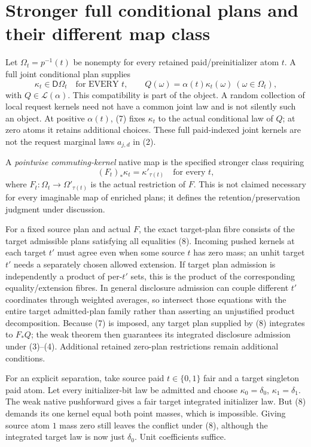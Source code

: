 \documentclass[11pt]{article}
\begin{document}
\section{Stronger full conditional plans and their different map class}
Let $\Omega_t=p^{-1}(t)$ be nonempty for every retained paid/preinitializer atom $t$. A full joint conditional plan supplies
\[
 \kappa_t\in\mathsf D\Omega_t\quad\text{for EVERY }t,
 \qquad Q(\omega)=\alpha(t)\kappa_t(\omega)\ (\omega\in\Omega_t), \tag{7}
\]
with $Q\in\mathcal L(\alpha)$. This compatibility is part of the object. A random collection of local request kernels need not have a common joint law and is not silently such an object. At positive $\alpha(t)$, (7) fixes $\kappa_t$ to the actual conditional law of $Q$; at zero atoms it retains additional choices. These full paid-indexed joint kernels are not the request marginal laws $a_{j,d}$ in (2).

A \emph{pointwise commuting-kernel} native map is the specified stronger class requiring
\[
                  (F_t)_*\kappa_t=\kappa'_{\tau(t)}
                       \quad\text{for every }t,       \tag{8}
\]
where $F_t:\Omega_t\to\Omega'_{\tau(t)}$ is the actual restriction of $F$. This is not claimed necessary for every imaginable map of enriched plans; it defines the retention/preservation judgment under discussion.

For a fixed source plan and actual $F$, the exact target-plan fibre consists of the target admissible plans satisfying all equalities (8). Incoming pushed kernels at each target $t'$ must agree even when some source $t$ has zero mass; an unhit target $t'$ needs a separately chosen allowed extension. If target plan admission is independently a product of per-$t'$ sets, this is the product of the corresponding equality/extension fibres. In general disclosure admission can couple different $t'$ coordinates through weighted averages, so intersect those equations with the entire target admitted-plan family rather than asserting an unjustified product decomposition. Because (7) is imposed, any target plan supplied by (8) integrates to $F_*Q$; the weak theorem then guarantees its integrated disclosure admission under (3)--(4). Additional retained zero-plan restrictions remain additional conditions.

For an explicit separation, take source paid $t\in\{0,1\}$ fair and a target singleton paid atom. Let every initializer-bit law be admitted and choose $\kappa_0=\delta_0$, $\kappa_1=\delta_1$. The weak native pushforward gives a fair target integrated initializer law. But (8) demands its one kernel equal both point masses, which is impossible. Giving source atom $1$ mass zero still leaves the conflict under (8), although the integrated target law is now just $\delta_0$. Unit coefficients suffice.
\end{document}
